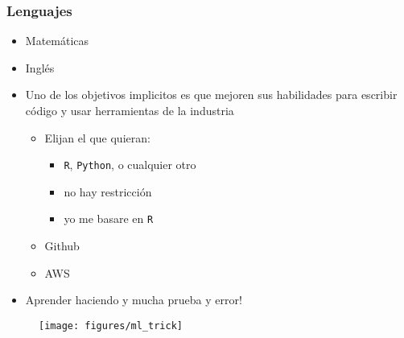\documentclass[
  shownotes,
  xcolor={svgnames},
  hyperref={colorlinks,citecolor=DarkBlue,linkcolor=DarkRed,urlcolor=DarkBlue}
  ]{beamer}
\begin{document}
\begin{frame}
\frametitle{Lenguajes}


\begin{minipage}[t]{0.58\linewidth}
        \begin{itemize}
            \item Matemáticas
            \bigskip
            \item Inglés
            \bigskip
            \item Uno de los objetivos implicitos es que mejoren sus habilidades para escribir código y usar herramientas de la industria
            \begin{itemize}
              \item Elijan el que quieran: 
              \begin{itemize}
                \item \texttt{R}, \texttt{Python}, o cualquier otro
                \item no hay restricción
                \item yo me basare en \texttt{R}
                \end{itemize}
              \item Github
              \item AWS
            \end{itemize}
            \item Aprender haciendo y mucha prueba y error! 
            
        \end{itemize}
    \end{minipage}
    \hfill
    \begin{minipage}[t]{0.38\linewidth}%
        \begin{figure}[H] \centering
            \captionsetup{justification=centering}  
            \texttt{[image: figures/ml\_trick]}
    \end{figure}
    \end{minipage}

\end{frame}

\end{document}
